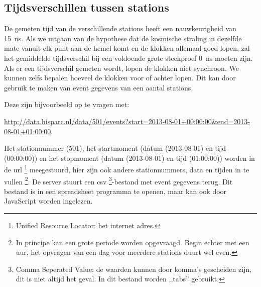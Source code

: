\subsection{Tijdsverschillen tussen stations}

De gemeten tijd van de verschillende stations heeft een nauwkeurigheid
van \SI{15}{\nano\second}. Als we uitgaan van de hypothese dat de
kosmische straling in dezelfde mate vanuit elk punt aan de hemel
komt en de klokken allemaal goed lopen, zal het gemiddelde tijdsverschil
bij een voldoende grote steekproef \SI{0}{\nano\second} moeten zijn.
Als er een tijdsverschil gemeten wordt, lopen de klokken niet synchroon.
We kunnen zelfs bepalen hoeveel de klokken voor of achter lopen. Dit
kan door gebruik te maken van event gegevens van een aantal stations. 

Deze zijn bijvoorbeeld op te vragen met:

\url{http://data.hisparc.nl/data/501/events?start=2013-08-01+00:00:00&end=2013-08-01+01:00:00}.

Het stationnummer (501), het startmoment (datum (2013-08-01) en tijd
(00:00:00)) en het stopmoment (datum (2013-08-01) en tijd (01:00:00))
worden in de url%
\footnote{Unified Resource Locator: het internet adres.%
} meegestuurd, hier zijn ook andere stationnummers, data en tijden
in te vullen%
\footnote{In principe kan een grote periode worden opgevraagd. Begin echter
met een uur, het opvragen van een dag voor meerdere stations duurt
wel even.%
}. De server stuurt een csv%
\footnote{Comma Seperated Value: de waarden kunnen door komma's gescheiden zijn,
dit is niet altijd het geval. In dit bestand worden ,,tabs'' gebruikt.%
}-bestand met event gegevens terug. Dit bestand is in een spreadsheet
programma te openen, maar kan ook door JavaScript worden ingelezen.

